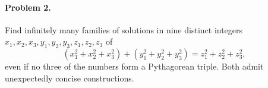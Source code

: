 \documentclass[11pt,a4paper]{article}
\begin{document}
\paragraph{Problem 2.}
Find infinitely many families of solutions in nine distinct integers
$x_1,x_2,x_3,y_1,y_2,y_3,z_1,z_2,z_3$ of
\[
(x_1^2+x_2^2+x_3^2)+(y_1^2+y_2^2+y_3^2)=z_1^2+z_2^2+z_3^2,
\]
even if no three of the numbers form a Pythagorean triple.
Both admit unexpectedly concise constructions.
\end{document}
